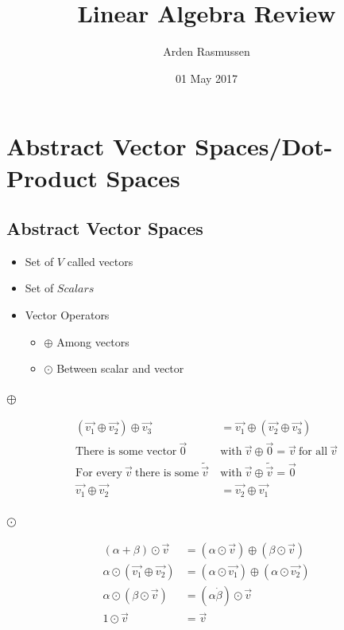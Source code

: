 \documentclass[12pt]{article}
\title{Linear Algebra Review}
\author{Arden Rasmussen}
\date{01 May 2017}
\begin{document}
\maketitle
\newpage
\tableofcontents
\newpage
{}
\section{Abstract Vector Spaces/Dot-Product Spaces}\label{a}
\subsection{Abstract Vector Spaces}\label{a:a}
\begin{itemize}
  \item Set of $V$ called vectors
  \item Set of $Scalars$
  \item Vector Operators
  \begin{itemize}
    \item $\oplus$ Among vectors
    \item $\odot$ Between scalar and vector
  \end{itemize}
\end{itemize}
\subsubsection{$\oplus$}\label{a:a:p}
\begin{align}
  \left(\vec{v_1}\oplus\vec{v_2}\right)\oplus\vec{v_3} &= \vec{v_1}\oplus\left(\vec{v_2}\oplus\vec{v_3}\right)\\
  \text{There is some vector}\ \vec{0}\ &\text{with}\ \vec{v}\oplus\vec{0}=\vec{v}\ \text{for all}\ \vec{v}\\
  \text{For every}\ \vec{v}\ \text{there is some}\ \widetilde{\vec{v}}\ &\text{with}\ \vec{v}\oplus\widetilde{\vec{v}}=\vec{0}\\
  \vec{v_1}\oplus\vec{v_2}&=\vec{v_2}\oplus\vec{v_1}
\end{align}
\subsubsection{$\odot$}\label{a:a:d}
\begin{align}
  \left( \alpha + \beta \right) \odot \vec{v} &= \left( \alpha \odot \vec{v} \right) \oplus \left( \beta \odot \vec{v} \right)\\
  \alpha \odot \left( \vec{v_1} \oplus \vec{v_2} \right) &= \left( \alpha \odot \vec{v_1} \right) \oplus \left( \alpha \odot \vec{v_2} \right)\\
  \alpha \odot \left( \beta \odot \vec{v} \right) &= \left( \alpha \dot \beta \right) \odot \vec{v}\\
  1 \odot \vec{v} &= \vec{v}
\end{align}
\end{document}
